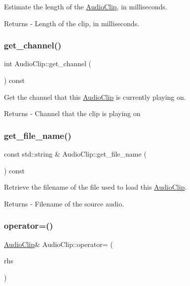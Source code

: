 Estimate the length of the \mbox{\hyperlink{class_audio_clip}{Audio\+Clip}}, in milliseconds. \begin{DoxyReturn}{Returns}
-\/ Length of the clip, in milliseconds. 
\end{DoxyReturn}
\mbox{\label{class_audio_clip_a86486cb3622e9056d4d5f580889f9f16}} 
\subsubsection{\texorpdfstring{get\+\_\+channel()}{get\_channel()}}
{\footnotesize\ttfamily int Audio\+Clip\+::get\+\_\+channel (\begin{DoxyParamCaption}{ }\end{DoxyParamCaption}) const}

Get the channel that this \mbox{\hyperlink{class_audio_clip}{Audio\+Clip}} is currently playing on. \begin{DoxyReturn}{Returns}
-\/ Channel that the clip is playing on 
\end{DoxyReturn}
\mbox{\label{class_audio_clip_aadb9a7b1a085647f61f0120953734ca0}} 
\subsubsection{\texorpdfstring{get\+\_\+file\+\_\+name()}{get\_file\_name()}}
{\footnotesize\ttfamily const std\+::string \& Audio\+Clip\+::get\+\_\+file\+\_\+name (\begin{DoxyParamCaption}{ }\end{DoxyParamCaption}) const}

Retrieve the filename of the file used to load this \mbox{\hyperlink{class_audio_clip}{Audio\+Clip}}. \begin{DoxyReturn}{Returns}
-\/ Filename of the source audio. 
\end{DoxyReturn}
\mbox{\label{class_audio_clip_ac1466d6ec65150fa8beb08611cda995c}} 
\subsubsection{\texorpdfstring{operator=()}{operator=()}}
{\footnotesize\ttfamily \mbox{\hyperlink{class_audio_clip}{Audio\+Clip}}\& Audio\+Clip\+::operator= (\begin{DoxyParamCaption}\item[{const \mbox{\hyperlink{class_audio_clip}{Audio\+Clip}} \&}]{rhs }\end{DoxyParamCaption})\hspace{0.3cm}{\ttfamily [delete]}}

